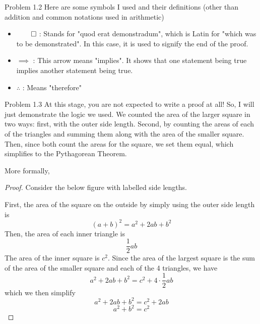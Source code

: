 \begin{sol}{Problem 1.2}
Here are some symbols I used and their definitions (other than addition and common notations used in arithmetic)
\begin{itemize}
\item $\qed$ : Stands for "quod erat demonstradum", which is Latin for "which was to be demonstrated". In this case, it is used to signify the end of the proof.
\item $\implies$ : This arrow means "implies". It shows that one statement being true implies another statement being true.
\item $\therefore$ : Means "therefore"
\end{itemize}
\end{sol}

\begin{sol}{Problem 1.3}
At this stage, you are not expected to write a proof at all! So, I will just demonstrate the logic we used. We counted the area of the larger square in two ways: first, with the outer side length. Second, by counting the areas of each of the triangles and summing them along with the area of the smaller square. Then, since both count the areas for the square, we set them equal, which simplifies to the Pythagorean Theorem.

More formally,
\begin{proof}
Consider the below figure with labelled side lengths. 
\begin{center}
\end{center}

First, the area of the square on the outside by simply using the outer side length is 
\[
(a+b)^2 = a^2 + 2ab + b^2
\]
Then, the area of each inner triangle is 
\[
\frac{1}{2}ab
\]
The area of the inner square is $c^2$. Since the area of the largest square is the sum of the area of the smaller square and each of the 4 triangles, we have 
\[
a^2 + 2ab + b^2 = c^2 + 4 \cdot \frac{1}{2}ab
\]
which we then simplify
\[
a^2 + 2ab + b^2 = c^2 + 2ab
\]
\[
a^2 + b^2 = c^2
\]
\end{proof}
\end{sol}

